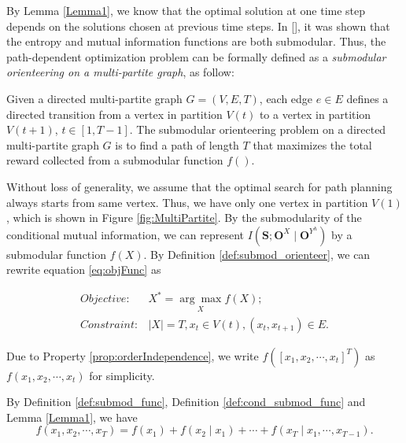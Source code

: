 By Lemma \ref{Lemma1}, we know that the optimal solution at one time step depends on the solutions chosen at previous time steps. 
In [\cite{krause2012submodular}], it was shown that the entropy and mutual information functions are both submodular.
Thus, the path-dependent optimization problem can be formally defined as a \emph{submodular orienteering on a multi-partite graph}, as follow:

\begin{mydef}
\label{def:submod_orienteer}
Given a directed multi-partite graph $ G = (V, E, T) $, each edge $ e \in E $ defines a directed transition from a vertex in partition $ V(t) $ to a vertex in partition $ V(t+1) $, $ t \in [1, T-1] $.
The submodular orienteering problem on a directed multi-partite graph $ G $ is to find a path of length $ T $ that maximizes the total reward collected from a submodular function $ f() $.
\end{mydef}

Without loss of generality, we assume that the optimal search for path planning always starts from same vertex.
Thus, we have only one vertex in partition $ V(1) $, which is shown in Figure \ref{fig:MultiPartite}.
By the submodularity of the conditional mutual information, we can represent $ I(\mathbf{S}; \mathbf{O}^{X} \mid \mathbf{O}^{Y^{h}}) $ by a submodular function  $ f(X) $. 
By Definition \ref{def:submod_orienteer}, we can rewrite equation 
 \eqref{eq:objFunc} as 

\begin{equation}
\label{eq:gnr_obj}
\begin{aligned}
Objective: & X^{*} = \underset{X}{\arg\max} f(X); \\
Constraint: & |X| = T, x_{t} \in V(t), (x_{t}, x_{t+1}) \in E.
\end{aligned}
\end{equation}

Due to Property \ref{prop:orderIndependence}, we write $ f( [x_{1}, x_{2} , \cdots , x_{t} ]^{T} ) $ as $ f(x_{1}, x_{2}, \cdots , x_{t}) $ for simplicity.

By Definition \ref{def:submod_func}, Definition \ref{def:cond_submod_func} and Lemma \ref{Lemma1}, we have
\begin{equation}
\label{eq:gnr_f_chain}
f(x_{1}, x_{2}, \cdots , x_{T}) = f(x_{1}) + f(x_{2} \mid x_{1}) + \cdots + f(x_{T} \mid x_{1}, \cdots , x_{T-1}).
\end{equation}


